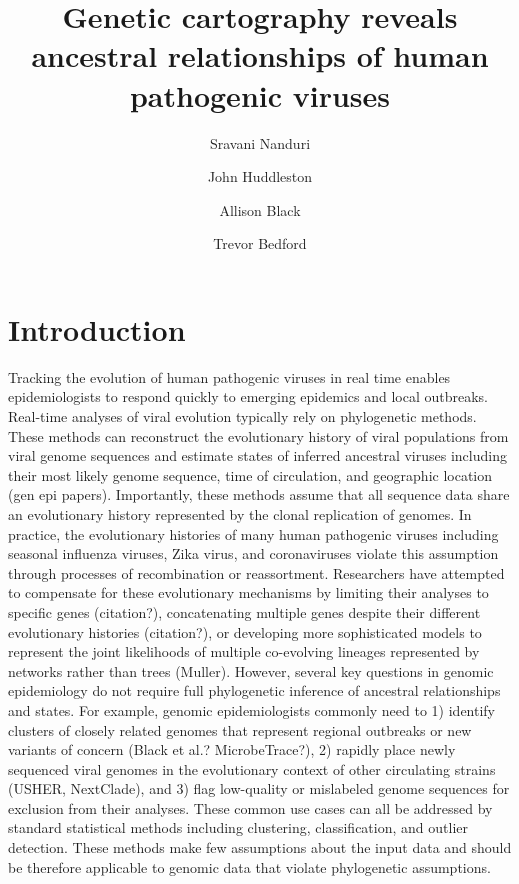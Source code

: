 \documentclass[9pt,lineno]{elife}
\title{Genetic cartography reveals ancestral relationships of human pathogenic viruses}
\author[1]{Sravani Nanduri}
\author[2]{John Huddleston}
\author[2]{Allison Black}
\author[2*]{Trevor Bedford}
\affil[1]{Issaquah High School, Issaquah, WA, USA}
\affil[2]{Vaccine and Infectious Disease Division, Fred Hutchinson Cancer Research Center, Seattle, WA, USA}
\date{}
\begin{document}
\maketitle

\begin{abstract}
\end{abstract}

\section*{Introduction}

Tracking the evolution of human pathogenic viruses in real time enables epidemiologists to respond quickly to emerging epidemics and local outbreaks.
Real-time analyses of viral evolution typically rely on phylogenetic methods.
These methods can reconstruct the evolutionary history of viral populations from viral genome sequences and estimate states of inferred ancestral viruses including their most likely genome sequence, time of circulation, and geographic location (gen epi papers).
Importantly, these methods assume that all sequence data share an evolutionary history represented by the clonal replication of genomes.
In practice, the evolutionary histories of many human pathogenic viruses including seasonal influenza viruses, Zika virus, and coronaviruses violate this assumption through processes of recombination or reassortment.
Researchers have attempted to compensate for these evolutionary mechanisms by limiting their analyses to specific genes (citation?), concatenating multiple genes despite their different evolutionary histories (citation?), or developing more sophisticated models to represent the joint likelihoods of multiple co-evolving lineages represented by networks rather than trees (Muller).
However, several key questions in genomic epidemiology do not require full phylogenetic inference of ancestral relationships and states.
For example, genomic epidemiologists commonly need to 1) identify clusters of closely related genomes that represent regional outbreaks or new variants of concern (Black et al.? MicrobeTrace?), 2) rapidly place newly sequenced viral genomes in the evolutionary context of other circulating strains (USHER, NextClade), and 3) flag low-quality or mislabeled genome sequences for exclusion from their analyses.
These common use cases can all be addressed by standard statistical methods including clustering, classification, and outlier detection.
These methods make few assumptions about the input data and should be therefore applicable to genomic data that violate phylogenetic assumptions.
\end{document}
